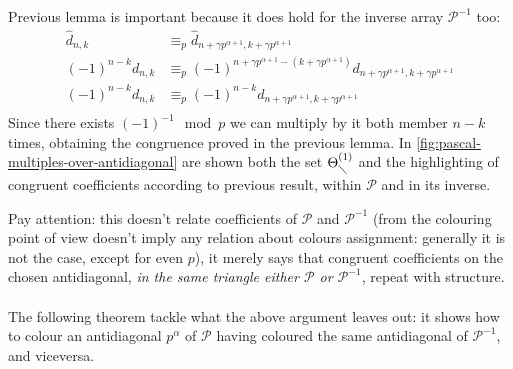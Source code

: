 Previous lemma is important because it does hold for the inverse array $\mathcal{P}^{-1}$ too:
\begin{displaymath}
    \begin{split}
        \hat{d}_{n,k} &\equiv_{p} \hat{d}_{n+\gamma p^{\alpha+1}, k+\gamma p^{\alpha+1}} \\
        (-1)^{n-k}d_{n,k} &\equiv_{p} (-1)^{n+\gamma p^{\alpha+1}-(k+\gamma p^{\alpha+1})}d_{n+\gamma p^{\alpha+1}, k+\gamma p^{\alpha+1}} \\
        (-1)^{n-k}d_{n,k} &\equiv_{p} (-1)^{n-k}d_{n+\gamma p^{\alpha+1}, k+\gamma p^{\alpha+1}} \\
    \end{split}
\end{displaymath}
Since there exists $(-1)^{-1}\mod p$ we can multiply by it both member $n-k$ times,
obtaining the congruence proved in the previous lemma.
In \autoref{fig:pascal-multiples-over-antidiagonal} are shown both the set
$\Theta_{\diagdown}^{(1)}$ and the highlighting of congruent coefficients
according to previous result, within $\mathcal{P}$ and in its inverse.

Pay attention: this doesn't relate coefficients
of $\mathcal{P}$ and $\mathcal{P}^{-1}$ (from the colouring point of view 
doesn't imply any relation about colours assignment: generally it is not the case,
except for even $p$), it merely says that 
congruent coefficients on the chosen antidiagonal, \emph{in the same triangle
either $\mathcal{P}$ or $\mathcal{P}^{-1}$}, repeat with structure.
\\\\
The following theorem tackle what the above argument leaves out: it 
shows how to colour an antidiagonal $p^{\alpha}$ of $\mathcal{P}$
having coloured the same antidiagonal of $\mathcal{P}^{-1}$, and viceversa.



